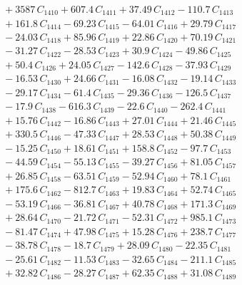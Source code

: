 \documentclass[a4paper,11pt]{article}
\begin{document}
\begin{align}
&\quad + 3587\,C_{1410} + 607.4\,C_{1411} + 37.49\,C_{1412} - 110.7\,C_{1413} \nonumber\\
&\quad + 161.8\,C_{1414} - 69.23\,C_{1415} - 64.01\,C_{1416} + 29.79\,C_{1417} \nonumber\\
&\quad - 24.03\,C_{1418} + 85.96\,C_{1419} + 22.86\,C_{1420} + 70.19\,C_{1421} \nonumber\\
&\quad - 31.27\,C_{1422} - 28.53\,C_{1423} + 30.9\,C_{1424} - 49.86\,C_{1425} \nonumber\\
&\quad + 50.4\,C_{1426} + 24.05\,C_{1427} - 142.6\,C_{1428} - 37.93\,C_{1429} \nonumber\\
&\quad - 16.53\,C_{1430} + 24.66\,C_{1431} - 16.08\,C_{1432} - 19.14\,C_{1433} \nonumber\\
&\quad - 29.17\,C_{1434} - 61.4\,C_{1435} - 29.36\,C_{1436} - 126.5\,C_{1437} \nonumber\\
&\quad - 17.9\,C_{1438} - 616.3\,C_{1439} - 22.6\,C_{1440} - 262.4\,C_{1441} \nonumber\\
&\quad + 15.76\,C_{1442} - 16.86\,C_{1443} + 27.01\,C_{1444} + 21.46\,C_{1445} \nonumber\\
&\quad + 330.5\,C_{1446} - 47.33\,C_{1447} + 28.53\,C_{1448} + 50.38\,C_{1449} \nonumber\\
&\quad - 15.25\,C_{1450} + 18.61\,C_{1451} + 158.8\,C_{1452} - 97.7\,C_{1453} \nonumber\\
&\quad - 44.59\,C_{1454} - 55.13\,C_{1455} - 39.27\,C_{1456} + 81.05\,C_{1457} \nonumber\\
&\quad + 26.85\,C_{1458} - 63.51\,C_{1459} - 52.94\,C_{1460} + 78.1\,C_{1461} \nonumber\\
&\quad + 175.6\,C_{1462} - 812.7\,C_{1463} + 19.83\,C_{1464} + 52.74\,C_{1465} \nonumber\\
&\quad - 53.19\,C_{1466} - 36.81\,C_{1467} + 40.78\,C_{1468} + 171.3\,C_{1469} \nonumber\\
&\quad + 28.64\,C_{1470} - 21.72\,C_{1471} - 52.31\,C_{1472} + 985.1\,C_{1473} \nonumber\\
&\quad - 81.47\,C_{1474} + 47.98\,C_{1475} + 15.28\,C_{1476} + 238.7\,C_{1477} \nonumber\\
&\quad - 38.78\,C_{1478} - 18.7\,C_{1479} + 28.09\,C_{1480} - 22.35\,C_{1481} \nonumber\\
&\quad - 25.61\,C_{1482} - 11.53\,C_{1483} - 32.65\,C_{1484} - 211.1\,C_{1485} \nonumber\\
&\quad + 32.82\,C_{1486} - 28.27\,C_{1487} + 62.35\,C_{1488} + 31.08\,C_{1489} \nonumber\\

\end{align}
\end{document}

